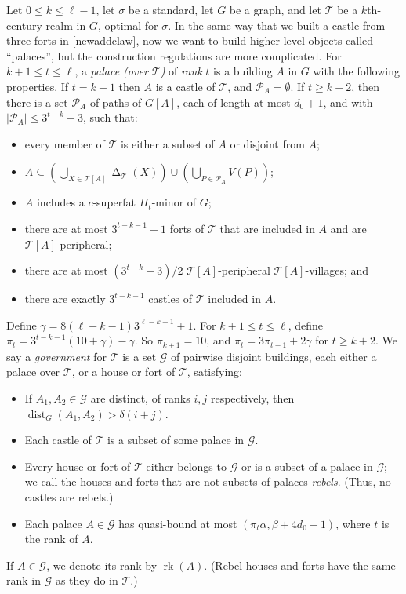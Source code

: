 \documentclass[titlepage,11pt]{article}
\newcommand{\dist}{\operatorname{dist}}
\newcommand{\voro}{\operatorname{\Delta}}
\newcommand{\gtype}{\operatorname{rk}}
\newcommand{\mac}{\mathcal}
\begin{document}
	Let $0\le k\le \ell-1$, let $\sigma$ be a standard, let $G$ be a graph, and let 
	$\mathcal{T}$ be a $k$th-century realm in $G$, optimal for $\sigma$. 
	In the same way that we built a castle from three forts in \ref{newaddclaw}, now we want to build higher-level objects called ``palaces'', but the construction
	regulations are more complicated. 
	For $k+1\le t\le \ell$, a {\em palace (over $\mac T$)} of {\em rank} $t$ is a building $A$ in $G$
	with the following properties. If $t=k+1$ then $A$ is  a castle of $\mac T$, and $\mac P_A=\emptyset$. If $t\ge k+2$, then
	there is a set $\mac P_A$ of paths of $G[A]$, each of length at most $d_0+1$, and with $|\mac P_A|\le 3^{t-k}-3$, such that:
	\begin{itemize}
		\item every member of $\mac T$ is either a subset of $A$ or disjoint from $A$;
		\item $A\subseteq \left(\bigcup_{X\in \mac T[A]} \voro_{\mac T}(X)\right) \cup \left(\bigcup_{P\in \mac P_A}V(P)\right)$;
		\item $A$ includes a $c$-superfat $H_t$-minor of $G$; 
		\item there are at most $3^{t-k-1}-1$ forts of $\mac T$ that are included in $A$ and are $\mac T[A]$-peripheral;
		\item there are at most $(3^{t-k}-3)/2$ $\mac T[A]$-peripheral $\mac T[A]$-villages; and
		\item there are exactly $3^{t-k-1}$ castles of $\mac T$ included in $A$.
	\end{itemize}
	
	
	Define $\gamma = 8(\ell-k-1)3^{\ell-k-1}+1$.
	For $k+1\le t\le \ell$, define $\pi_t=3^{t-k-1}(10+\gamma) -\gamma$. 
	So $\pi_{k+1} = 10$, and $\pi_t=3\pi_{t-1}+2\gamma$ for $t\ge k+2$.
	We say a {\em government} for $\mac T$ is a set $\mac G$ of 
	pairwise disjoint buildings, each either a palace over $\mac T$, or a house or fort of $\mac T$, 
	satisfying:
	\begin{itemize}
		\item If $A_1,A_2\in \mac G$
		are distinct, of ranks $i,j$ respectively, then $\dist_G(A_1, A_2)> \delta(i+j)$.
		\item Each castle of $\mac T$ is a subset of some palace in $\mac G$.
		\item Every house or fort of $\mac T$ either belongs to $\mac G$ or is a subset of a palace in $\mac G$; we call the houses and forts that are not subsets of
		palaces {\em rebels}. (Thus, no castles are rebels.)
		\item Each palace $A\in \mac G$ has quasi-bound at most $(\pi_t\alpha,\beta+4d_0+1)$, 
		where $t$ is the rank of $A$.
	\end{itemize}
	If $A\in \mac G$, we denote its rank by $\gtype(A)$. (Rebel houses and forts have the same rank in $\mac G$ as they do in $\mac T$.)
	
\end{document}
